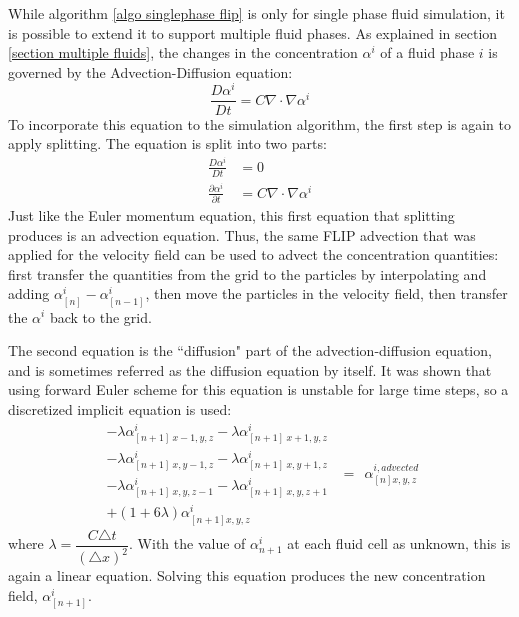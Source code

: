 While algorithm \ref{algo singlephase flip} is only for single phase fluid simulation, it is possible to extend it to support multiple fluid phases. As explained in section \ref{section multiple fluids}, the changes in the concentration $\alpha^i$ of a fluid phase $i$ is governed by the Advection-Diffusion equation:
$$
\frac{D \alpha^i}{D t} = C\nabla \cdot \nabla \alpha^i
$$
To incorporate this equation to the simulation algorithm, the first step is again to apply splitting. The equation is split into two parts:
\begin{equation*}
    \begin{aligned}
        \frac{D \alpha^i}{D t} &= 0\\
        \frac{\partial \alpha^i}{\partial t} &= C\nabla \cdot \nabla \alpha^i
    \end{aligned}
\end{equation*}
Just like the Euler momentum equation, this first equation that splitting produces is an advection equation. Thus, the same FLIP advection that was applied for the velocity field can be used to advect the concentration quantities: first transfer the quantities from the grid to the particles by interpolating and adding $\alpha^{i}_{[n]} - \alpha^{i}_{[n-1]}$, then move the particles in the velocity field, then transfer the $\alpha^i$ back to the grid. 

The second equation is the ``diffusion" part of the advection-diffusion equation, and is sometimes referred as the diffusion equation by itself. It was shown that using forward Euler scheme for this equation is unstable for large time steps\cite{kang2010hybrid}, so a discretized implicit equation is used:
\begin{equation}
    \begin{aligned}
        - \lambda\alpha^i_{[n+1]~x-1,y,z}
        - \lambda\alpha^i_{[n+1]~x+1,y,z}\\
        - \lambda\alpha^i_{[n+1]~x,y-1,z}
        - \lambda\alpha^i_{[n+1]~x,y+1,z}\\
        - \lambda\alpha^i_{[n+1]~x,y,z-1}
        - \lambda\alpha^i_{[n+1]~x,y,z+1}\\
        +(1+6\lambda)\alpha^i_{[n+1] x,y,z} 
    \end{aligned}
    ~~=~~ \alpha^{i,advected}_{[n] x,y,z} 
    \label{eqn diffusion}
\end{equation}
where $\lambda = \dfrac{C\triangle t}{(\triangle x)^2}$. With the value of $\alpha^i_{n+1}$ at each fluid cell as unknown, this is again a linear equation. Solving this equation produces the new concentration field, $\alpha^i_{[n+1]}$.

